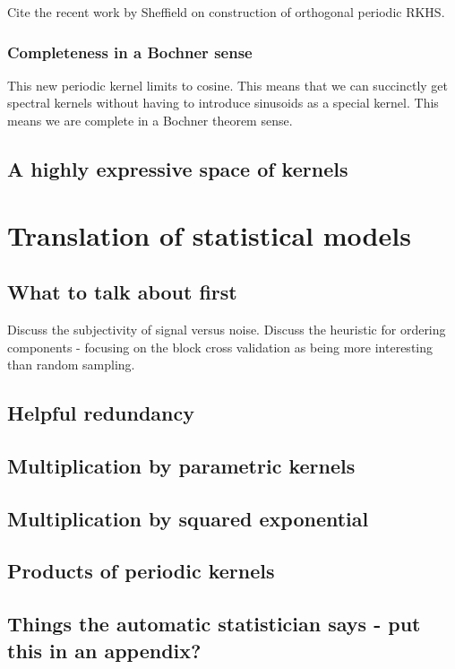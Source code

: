 \documentclass[twoside]{article}
\begin{document}
Cite the recent work by Sheffield on construction of orthogonal periodic RKHS.

\subsubsection{Completeness in a Bochner sense}

This new periodic kernel limits to cosine.
This means that we can succinctly get spectral kernels without having to introduce sinusoids as a special kernel.
This means we are complete in a Bochner theorem sense.

\subsection{A highly expressive space of kernels}

\section{Translation of statistical models}
\label{sec:method}

\subsection{What to talk about first}

Discuss the subjectivity of signal versus noise.
Discuss the heuristic for ordering components - focusing on the block cross validation as being more interesting than random sampling.

\subsection{Helpful redundancy}

\subsection{Multiplication by parametric kernels}

\subsection{Multiplication by squared exponential}

\subsection{Products of periodic kernels}

\subsection{Things the automatic statistician says - put this in an appendix?}
\end{document}
